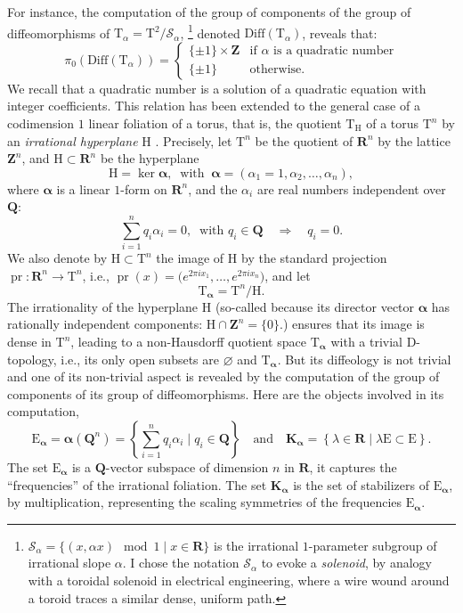 \documentclass[10pt,letterpaper,reqno]{amsart}
\theoremstyle{article}
\newcommand{\1}{{\hat 1}}
\newcommand{\0}{{\hat 0}}
\newcommand{\KK}{{\mathbf K}}
\newcommand{\QQ}{\mathbf Q}
\newcommand{\RR}{\mathbf R}
\newcommand{\ZZ}{\mathbf Z}
\newcommand{\balpha}{{\pmb{\alpha}}}
\newcommand{\cS}{{\mathcal S}}
\def \E{\mathrm E}
\def \H{\mathrm H}
\def \T{\mathrm T}
\newcommand{\Diff}{\mathrm{Diff}}
\newcommand{\pr}{\operatorname{pr}}
\def \H{\mathrm H}
\begin{document}
  For instance, the computation of the group of components of the group of diffeomorphisms of $\T_\alpha = \T^2/\cS_\alpha$,%
  \footnote{$\cS_\alpha = \{ (x, \alpha x) \mod 1 \mid x \in \RR \}$ is the irrational $1$-parameter subgroup of irrational slope $\alpha$. I chose the notation $\cS_\alpha$ to evoke a \emph{solenoid}, by analogy with a toroidal solenoid in electrical engineering, where a wire wound around a toroid traces a similar dense, uniform path.}
  denoted $\Diff(\T_\alpha)$, reveals that:
  $$
    \pi_0(\Diff(\T_\alpha)) =
    \left\{
    \begin{array}{ll}
    \{\pm 1\} \times \ZZ & \text{if $\alpha$ is a quadratic number} \\[2mm]
    \{\pm 1\} & \text{otherwise}.
    \end{array}
    \right.
    $$
  We recall that a quadratic number is a solution of a quadratic equation with integer coefficients.
  This relation has been extended to the general case of a codimension $1$ linear foliation of a torus,
  that is,
  the quotient $\T_\H$ of a torus $\T^n$ by an \emph{irrational hyperplane} $\H$ \cite{IZL90}.
  Precisely,
  let $\T^n$ be the quotient of $\RR^n$ by the lattice $\ZZ^n$,
  and $\H \subset \RR^n$ be the hyperplane
  $$
    \H = \ker \balpha, \ \text{ with } \
    \balpha = (\alpha_1 = 1,\alpha_2,\ldots,\alpha_n),
    $$
  where $\balpha$ is a linear $1$-form on $\RR^n$,
  and the $\alpha_i$ are real numbers independent over $\QQ$:
  $$
    \sum_{i=1}^n q_i \alpha_i = 0, \ \text{ with $q_i \in \QQ$} \quad \Rightarrow \quad q_i = 0.
    $$
  We also denote by $\H \subset \T^n$ the image of $\H$ by the standard projection $\pr : \RR^n \to \T^n$,
  i.e.,
  $\pr(x) = \big(e^{2\pi i x_1}, \dots, e^{2\pi i x_n}\big)$,
  and let
  $$
    \T_{\balpha} = \T^n/\H.
    $$
  The irrationality of the hyperplane $\H$
  (so-called because its director vector $\balpha$ has rationally independent components: $\H \cap \ZZ^n = \{0\}$.)
  ensures that its image is dense in $\T^n$,
  leading to a non-Hausdorff quotient space $\T_{\balpha}$ with a trivial D-topology,
  i.e.,
  its only open subsets are $\varnothing$ and $\T_{\balpha}$.
  But its diffeology is not trivial and one of its non-trivial aspect is revealed by the computation of the group of components of its group of diffeomorphisms.
  Here are the objects involved in its computation,
  $$
    \E_\balpha = \balpha(\QQ^n) = \left\{ \sum_{i=1}^n q_i \alpha_i \mid q_i \in \QQ \right\}
    \quad \text{and} \quad
    \displaystyle \KK_\balpha = \left\{ \lambda \in \RR \mid \lambda \E \subset \E \right\}.
    $$
  The set $\E_\balpha$ is a $\QQ$-vector subspace of dimension $n$ in $\RR$,
  it captures the ``frequencies'' of the irrational foliation.
  The set $\KK_\balpha$ is the set of stabilizers of $\E_\balpha$,
  by multiplication,
  representing the scaling symmetries of the frequencies $\E_\balpha$.
  
\end{document}
